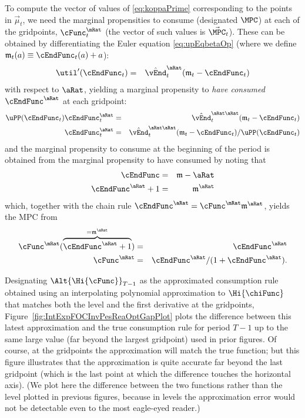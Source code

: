 \documentclass[titlepage]{\econtex}
\begin{document}
To compute the vector of values of \eqref{eq:koppaPrime} corresponding
to the points in $\vec{\mu}_{t}$, we need the marginal propensities to
consume (designated $\MPC$) at each of the gridpoints,
$\cFunc^{\mRat}_{t}$ (the vector of such values is 
$\vec{\MPC}_{t}$).  These can be obtained by differentiating the
Euler equation \eqref{eq:upEqbetaOp} (where we define
$\mathfrak{m}_{t}({a}) \equiv \cEndFunc_{t}({a})+{a}$):
\begin{eqnarray}
  \util^{\prime}({\cEndFunc}_{t})  & = & \hat{\vEnd}_{t}^{\aRat}(\mathfrak{m}_{t}-{\cEndFunc}_{t})
\end{eqnarray}
with respect to $\aRat$, yielding a marginal propensity to
\textit{have consumed} $\cEndFunc^{\aRat}$ at each gridpoint:
\begin{eqnarray}
  \uPP(\cEndFunc_{t})\cEndFunc_{t}^{\aRat} & = & \hat{\vEnd}_{t}^{\aRat\aRat}(\mathfrak{m}_{t}-{\cEndFunc}_{t})
  \\ \cEndFunc_{t}^{\aRat} & = & \hat{\vEnd}_{t}^{\aRat\aRat}(\mathfrak{m}_{t}-{\cEndFunc}_{t})/\uPP(\cEndFunc_{t})
\end{eqnarray}
and the marginal propensity to consume at the beginning of the period is obtained from the marginal
propensity to have consumed by noting that
\begin{eqnarray*}
  \cEndFunc & = & \mathfrak{m}-\aRat
  \\ \cEndFunc^{\aRat}+1 & = & \mathfrak{m}^{\aRat}
\end{eqnarray*}
which, together with the chain rule $\cEndFunc^{\aRat}  = \cFunc^{\mRat}\mathfrak{m}^{\aRat}$,
yields the MPC from
\begin{eqnarray}
  \cFunc^{\mRat}(\overbrace{\cEndFunc^{\aRat}+1}^{=\mathfrak{m}^{\aRat}}) & = & \cEndFunc^{\aRat}
  \\ \cFunc^{\mRat} & = & \cEndFunc^{\aRat}/(1+\cEndFunc^{\aRat}) \label{eq:MPCfromMPTHC}.
\end{eqnarray}


Designating $\Alt{\Hi{\cFunc}}_{T-1}$ as the approximated consumption rule
obtained using an interpolating polynomial approximation to $\Hi{\chiFunc}$
that matches both the level and the first derivative at the
gridpoints, Figure~\ref{fig:IntExpFOCInvPesReaOptGapPlot} plots the
difference between this latest approximation and the true consumption
rule for period $T-1$ up to the same large value (far beyond the
largest gridpoint) used in prior figures.  Of course, at the
gridpoints the approximation will match the true function; but this
figure illustrates that the approximation is quite accurate far beyond
the last gridpoint (which is the last point at which the difference
touches the horizontal axis).  (We plot here the difference between the
two functions rather than the level plotted in previous figures, because
in levels the approximation error would not be detectable even to the
most eagle-eyed reader.)
\end{document}
